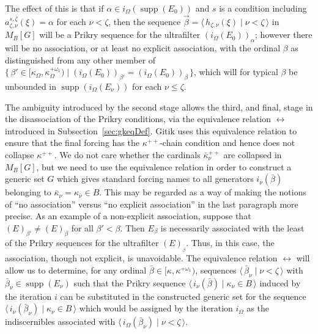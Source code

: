 \documentclass[
twoside,
]{article}
\theoremstyle{definition}
\theoremstyle{remark}
\newcommand{\ufFromExt}[2]{(#1)_{#2}}
\newcommand{\forceKappa}{\bar\kappa} %
\DeclareMathOperator{\supp}{supp}   %
\newcommand{\ords}{\Omega}
\newcommand\gkeq{\leftrightarrow}
\newcommand{\set}[1]{\{\,#1\,\}}
\newcommand{\pair}[1]{\langle#1\rangle}
\newcommand{\seq}[1]{\pair{\,#1\,}}
\begin{document}
 The effect of this is that if $\alpha\in i_{\ords}(\supp(E_0))$ and $s$ is a condition including
 $a^{s,\zeta}_{\zeta,\nu}(\xi)=\alpha$ for each $\nu<\zeta$, then the 
 sequence $\vec\beta=\seq{h_{\zeta,\nu}(\xi)\mid \nu<\zeta}$ in $M_B[G]$ 
 will be a Prikry sequence for the ultrafilter
 $\ufFromExt{i_{\ords}(E_0)}{\alpha}$;  however there will be no
 association, or at least no explicit association, with the ordinal
 $\beta$ as distinguished from
 any other member of $\set{\beta'\in[\kappa_{\ords},\kappa_{\ords}^{+\omega_1})\mid
   \ufFromExt{i_{\ords}(E_0)}{\beta'}=\ufFromExt{i_{\ords}(E_0)}{\beta}}$,
   which will for typical $\beta$ be unbounded in
   $\supp(i_{\ords}(E_\nu))$ for each $\nu\leq\zeta$. 
 
The ambiguity introduced by the second stage allows the third, and
final, stage in the disassociation of the Prikry 
 conditions, via the equivalence relation $\gkeq$  introduced in
 Subsection~\ref{sec:gkeqDef}.   Gitik uses this equivalence relation
 to ensure that the final  forcing has the $\kappa^{++}$-chain condition and
 hence does not collapse $\kappa^{++}$. 
 We do not care whether the cardinals 
 $\forceKappa_{\nu}^{++}$ are collapsed in $M_B[G]$, but we need to use
 the  equivalence relation in order to construct a generic set $G$ which gives
 standard forcing names to  all
 generators $i_{\bar\nu}(\bar\beta)$ belonging to
 $\forceKappa_{\nu}=\kappa_{\bar\nu}\in B$.   
 This may be regarded as a way of making the notions of ``no
 association'' versus ``no explicit
 association'' in the last paragraph more precise.  As an example of a
 non-explicit association, 
 suppose that 
 $\ufFromExt{E}{\beta'}\not=\ufFromExt{E}{\beta}$ for all
 $\beta'<\beta$.  
Then $E_{\beta}$ is necessarily associated with the least of the
Prikry sequences for the ultrafilter $\ufFromExt{E}{_{\beta}}$.
Thus, in this case, the
 association, though not explicit, is unavoidable.
 The equivalence relation $\gkeq$ will allow us to determine, for any 
 ordinal $\bar\beta\in
 [\kappa,\kappa^{+\omega_1})$,
 sequences $\seq{\bar\beta_{\nu}\mid\nu<\zeta}$ with
 $\bar\beta_\nu\in\supp(E_\nu)$ such that the Prikry
 sequence $\seq{i_{\nu}(\bar\beta)\mid\kappa_{\nu}\in B}$ 
 induced by the iteration $i$ can be
 substituted in the constructed generic set for the sequence
 $\seq{i_{\nu}(\bar\beta_\nu)\mid \kappa_\nu\in B}$ which would be assigned
 by the iteration $i_{\ords}$  as the indiscernibles associated with
 $\seq{i_{\ords}(\bar\beta_\nu)\mid\nu<\zeta}$. 
\end{document}
